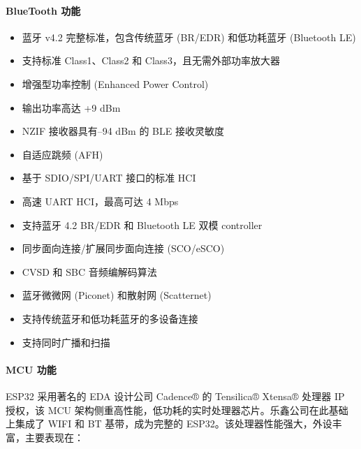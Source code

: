 \documentclass[a4paper,12pt,english]{sphinxmanual}
\begin{document}
\paragraph{BlueTooth 功能}
\label{\detokenize{dev-board/esp32:bluetooth}}\begin{itemize}
\item {} 
\sphinxAtStartPar
蓝牙 v4.2 完整标准，包含传统蓝牙 (BR/EDR) 和低功耗蓝牙 (Bluetooth LE)

\item {} 
\sphinxAtStartPar
支持标准 Class\sphinxhyphen{}1、Class\sphinxhyphen{}2 和 Class\sphinxhyphen{}3，且无需外部功率放大器

\item {} 
\sphinxAtStartPar
增强型功率控制 (Enhanced Power Control)

\item {} 
\sphinxAtStartPar
输出功率高达 +9 dBm

\item {} 
\sphinxAtStartPar
NZIF 接收器具有–94 dBm 的 BLE 接收灵敏度

\item {} 
\sphinxAtStartPar
自适应跳频 (AFH)

\item {} 
\sphinxAtStartPar
基于 SDIO/SPI/UART 接口的标准 HCI

\item {} 
\sphinxAtStartPar
高速 UART HCI，最高可达 4 Mbps

\item {} 
\sphinxAtStartPar
支持蓝牙 4.2 BR/EDR 和 Bluetooth LE 双模 controller

\item {} 
\sphinxAtStartPar
同步面向连接/扩展同步面向连接 (SCO/eSCO)

\item {} 
\sphinxAtStartPar
CVSD 和 SBC 音频编解码算法

\item {} 
\sphinxAtStartPar
蓝牙微微网 (Piconet) 和散射网 (Scatternet)

\item {} 
\sphinxAtStartPar
支持传统蓝牙和低功耗蓝牙的多设备连接

\item {} 
\sphinxAtStartPar
支持同时广播和扫描

\end{itemize}


\paragraph{MCU 功能}
\label{\detokenize{dev-board/esp32:mcu}}
\sphinxAtStartPar
ESP32 采用著名的 EDA 设计公司 Cadence® 的 Tensilica® Xtensa® 处理器 IP 授权，该 MCU 架构侧重高性能，低功耗的实时处理器芯片。乐鑫公司在此基础上集成了 WIFI 和 BT 基带，成为完整的 ESP32。该处理器性能强大，外设丰富，主要表现在：
\end{document}
